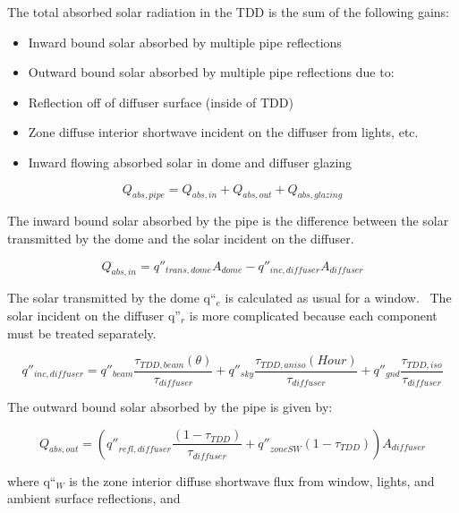 The total absorbed solar radiation in the TDD is the sum of the following gains:

\begin{itemize}
\item
  Inward bound solar absorbed by multiple pipe reflections
\item
  Outward bound solar absorbed by multiple pipe reflections due to:
\item
  Reflection off of diffuser surface (inside of TDD)
\item
  Zone diffuse interior shortwave incident on the diffuser from lights, etc.
\item
  Inward flowing absorbed solar in dome and diffuser glazing
\end{itemize}

\begin{equation}
{Q_{abs,pipe}} = {Q_{abs,in}} + {Q_{abs,out}} + {Q_{abs,glazing}}
\end{equation}

The inward bound solar absorbed by the pipe is the difference between the solar transmitted by the dome and the solar incident on the diffuser.

\begin{equation}
{Q_{abs,in}} = {q''_{trans,dome}}{A_{dome}} - {q''_{inc,diffuser}}{A_{diffuser}}
\end{equation}

The solar transmitted by the dome q``\(_{e}\) is calculated as usual for a window.~ The solar incident on the diffuser q''\(_{r}\) is more complicated because each component must be treated separately.

\begin{equation}
{q''_{inc,diffuser}} = {q''_{beam}}\frac{{{\tau_{TDD,beam}}(\theta )}}{{{\tau_{diffuser}}}} + {q''_{sky}}\frac{{{\tau_{TDD,aniso}}(Hour)}}{{{\tau_{diffuser}}}} + {q''_{gnd}}\frac{{{\tau_{TDD,iso}}}}{{{\tau_{diffuser}}}}
\end{equation}

The outward bound solar absorbed by the pipe is given by:

\begin{equation}
{Q_{abs,out}} = \left( {{{q''}_{refl,diffuser}}\frac{{\left( {1 - {\tau_{TDD}}} \right)}}{{{\tau_{diffuser}}}} + {{q''}_{zoneSW}}\left( {1 - {\tau_{TDD}}} \right)} \right){A_{diffuser}}
\end{equation}

where q``\(_{W}\) is the zone interior diffuse shortwave flux from window, lights, and ambient surface reflections, and

